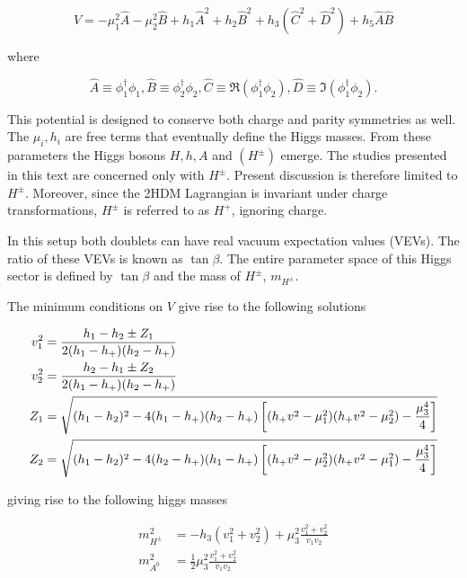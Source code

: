 \begin{equation}
V = -\mu_1^2\hat{A}-\mu_2^2\hat{B}+h_1\hat{A}^2+h_2\hat{B}^2+h_3(\hat{C}^2+\hat{D}^2)+h_5\hat{A}\hat{B}
\end{equation}

where 

\begin{equation*}
\hat{A} \equiv \phi_1^\dagger\phi_1, \hat{B}\equiv\phi_2^\dagger\phi_2,\hat{C}\equiv\Re(\phi_1^\dagger\phi_2), 
\hat{D}\equiv\Im(\phi_1^\dagger\phi_2).
\end{equation*}

This potential is designed to conserve both charge and parity symmetries as well.
 The $\mu_i,h_i$ are free terms that eventually 
define the Higgs masses. From these parameters the Higgs bosons $H,h,A$ and 
$(H^{\pm})$ emerge. The studies presented in this text are concerned only with $H^{\pm}$. 
Present discussion is therefore limited to $H^{\pm}$. 
Moreover, since the 2HDM Lagrangian is invariant under charge transformations,  
$H^{\pm}$ is referred to as $H^+$, ignoring charge. 

\par In this setup both doublets can have real 
vacuum expectation values (VEVs). The ratio of these VEVs is known as  
$\tan\beta$. The entire parameter space of this Higgs sector is defined by $\tan\beta$ 
and the mass of $H^{\pm}$, $m_{H^{\pm}}$.    

\par The minimum conditions on $V$ give rise to the following solutions  
 
\begin{equation}
\centering
\begin{aligned}
v_1^2 &= \frac{h_1-h_2\pm Z_1}{2(h_1 - h_+)(h_2 - h_+)} \\
v_2^2 &= \frac{h_2-h_1\pm Z_2}{2(h_1 - h_+)(h_2 - h_+)} \\
Z_1 &= \sqrt{(h_1-h_2)^2 - 4(h_1-h_+)(h_2-h_+)
\left [ (h_+v^2-\mu_1^2)(h_+v^2-\mu_2^2)-\frac{\mu_3^4}{4}\right ]} \\
Z_2 &= \sqrt{(h_1-h_2)^2 - 4(h_2-h_+)(h_1-h_+)
\left [ (h_+v^2-\mu_2^2)(h_+v^2-\mu_1^2)-\frac{\mu_3^4}{4}\right ]} \\
\end{aligned}
\end{equation}

giving rise to the following higgs masses 

\begin{equation}
\begin{aligned}
m_{H^{\pm}}^2 &= -h_3(v_1^2 + v_2^2)+\mu_3^2\frac{v_1^2+v_2^2}{v_1v_2} \\
m_{A^{0}}^2 &= \frac{1}{2}\mu_3^2\frac{v_1^2+v_2^2}{v_1v_2} \\
\end{aligned}
\end{equation}

